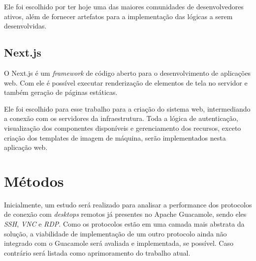 Ele foi escolhido por ter hoje uma das maiores comunidades de desenvolvedores ativos, além de fornecer artefatos para a implementação das lógicas a serem desenvolvidas.

\subsection{Next.js}\label{subsec:nextJs}

O Next.js é um \textit{framework} de código aberto para o desenvolvimento de aplicações web. Com ele é possível executar renderização de elementos de tela no servidor e também geração de páginas estáticas. \citep{nextjs}

Ele foi escolhido para esse trabalho para a criação do sistema web, intermediando a conexão com os servidores da infraestrutura. Toda a lógica de autenticação, visualização dos componentes disponíveis e gerenciamento dos recursos, exceto criação dos templates de imagem de máquina, serão implementados nesta aplicação web.



\section{Métodos}\label{sec:metodo}

Inicialmente, um estudo será realizado para analisar a performance dos protocolos de conexão com \textit{desktops} remotos já presentes no Apache Guacamole, sendo eles \textit{SSH}, \textit{VNC} e \textit{RDP}. Como os protocolos estão em uma camada mais abstrata da solução, a viabilidade de implementação de um outro protocolo ainda não integrado com o Guacamole será avaliada e implementada, se possível. Caso contrário será listada como aprimoramento do trabalho atual.


